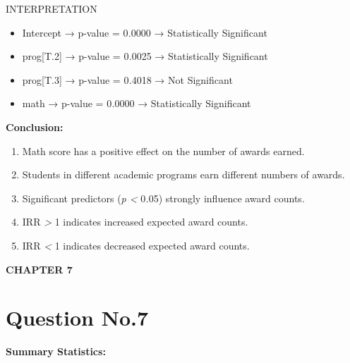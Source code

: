 INTERPRETATION

\begin{itemize}
\item
  Intercept → p-value = 0\emph{.}0000 → Statistically Significant
\item
  prog{[}T.2{]} → p-value = 0\emph{.}0025 → Statistically Significant
\item
  prog{[}T.3{]} → p-value = 0\emph{.}4018 → Not Significant
\item
  math → p-value = 0\emph{.}0000 → Statistically Significant
\end{itemize}

\textbf{Conclusion:}

\begin{enumerate}
\def\labelenumi{\arabic{enumi}.}
\item
  Math score has a positive effect on the number of awards earned.
\item
  Students in different academic programs earn different numbers of
  awards.
\item
  Significant predictors (\emph{p \textless{}} 0\emph{.}05) strongly
  influence award counts.
\item
  IRR \emph{\textgreater{}} 1 indicates increased expected award counts.
\item
  IRR \emph{\textless{}} 1 indicates decreased expected award counts.
\end{enumerate}

\textbf{CHAPTER 7}

\section{Question No.7}\label{question-no.7}

\textbf{Summary Statistics:}

